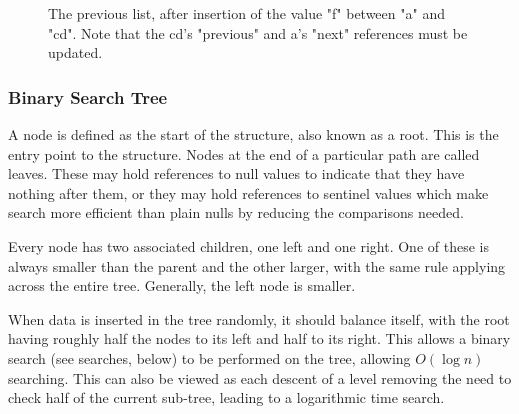 \documentclass[]{article}
\begin{document}
\begin{figure}[ph]
\centering
{}
\caption{The previous list, after insertion of the value "f" between "a" and "cd". Note that the cd's "previous" and a's "next" references must be updated.}
\end{figure}

\subsubsection{Binary Search Tree}

A node is defined as the start of the structure, also known as a root. This is the entry point to the structure. Nodes at the end of a particular path are called leaves. These may hold references to null values to indicate that they have nothing after them, or they may hold references to sentinel values which make search more efficient than plain nulls by reducing the comparisons needed.

Every node has two associated children, one left and one right. One of these is always smaller than the parent and the other larger, with the same rule applying across the entire tree. Generally, the left node is smaller.

When data is inserted in the tree randomly, it should balance itself, with the root having roughly half the nodes to its left and half to its right. This allows a binary search (see searches, below) to be performed on the tree, allowing $O(\log{n})$ searching. This can also be viewed as each descent of a level removing the need to check half of the current sub-tree, leading to a logarithmic time search.
\end{document}
